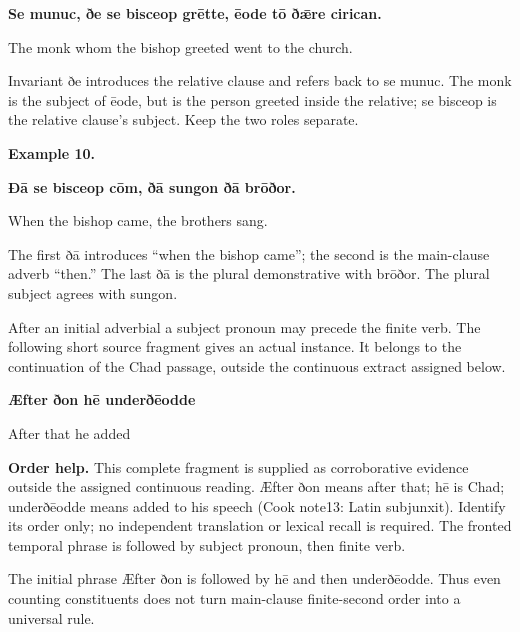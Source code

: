 \textbf{Se munuc, ðe se bisceop grētte, ēode tō ðǣre cirican.}

The monk whom the bishop greeted went to the church.

Invariant ðe introduces the relative clause and refers back to se munuc. The monk is the subject of ēode, but is the person greeted inside the relative; se bisceop is the relative clause’s subject. Keep the two roles separate.

\textbf{Example 10.}

\textbf{Ðā se bisceop cōm, ðā sungon ðā brōðor.}

When the bishop came, the brothers sang.

The first ðā introduces “when the bishop came”; the second is the main-clause adverb “then.” The last ðā is the plural demonstrative with brōðor. The plural subject agrees with sungon.

After an initial adverbial a subject pronoun may precede the finite verb. The following short source fragment gives an actual instance. It belongs to the continuation of the Chad passage, outside the continuous extract assigned below.

\textbf{Æfter ðon hē underðēodde}

After that he added

\textbf{Order help.} This complete fragment is supplied as corroborative evidence outside the assigned continuous reading. Æfter ðon means after that; hē is Chad; underðēodde means added to his speech (Cook note13: Latin subjunxit). Identify its order only; no independent translation or lexical recall is required. The fronted temporal phrase is followed by subject pronoun, then finite verb.

The initial phrase Æfter ðon is followed by hē and then underðēodde. Thus even counting constituents does not turn main-clause finite-second order into a universal rule.

